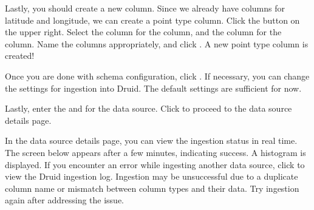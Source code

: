 \documentclass[letterpaper,10pt,english]{sphinxmanual}
\begin{document}
Lastly, you should create a new column. Since we already have columns for latitude and longitude, we can create a point type column. Click the  button on the upper right. Select the  column for the  column, and the  column for the  column. Name the columns appropriately, and click . A new point type column is created!
\begin{quote}

\begin{figure}[H]
\centering

\noindent{}
\end{figure}
\end{quote}

Once you are done with schema configuration, click . If necessary, you can change the settings for ingestion into Druid. The default settings are sufficient for now.
\begin{quote}

\begin{figure}[H]
\centering

\noindent{}
\end{figure}
\end{quote}

Lastly, enter the  and  for the data source. Click  to proceed to the data source details page.
\begin{quote}

\begin{figure}[H]
\centering

\noindent{}
\end{figure}
\end{quote}

In the data source details page, you can view the ingestion status in real time. The screen below appears after a few minutes, indicating success. A histogram is displayed. If you encounter an error while ingesting another data source, click  to view the Druid ingestion log. Ingestion may be unsuccessful due to a duplicate column name or mismatch between column types and their data. Try ingestion again after addressing the issue.
\begin{quote}

\begin{figure}[H]
\centering

\noindent{}
\end{figure}
\end{quote}
\end{document}
